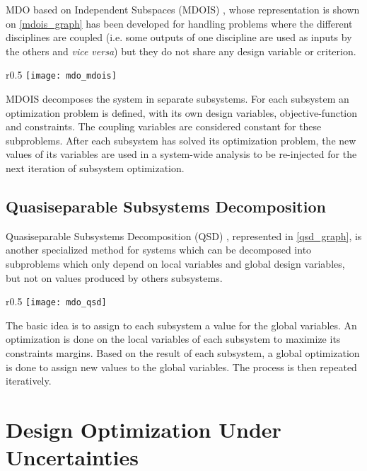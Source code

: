 MDO based on Independent Subspaces (MDOIS) \cite{NME:NME1380}, whose representation is shown on \figurename{} \ref{mdois_graph} has been developed for handling problems where the different disciplines are coupled (i.e. some outputs of one discipline are used as inputs by the others and \emph{vice versa}) but they do not share any design variable or criterion.

\begin{wrapfigure}{r}{0.5\textwidth}
\centering
\texttt{[image: mdo\_mdois]}
\caption{MDOIS method.}\label{mdois_graph}
\end{wrapfigure}

MDOIS decomposes the system in separate subsystems. For each subsystem an optimization problem is defined, with its own design variables, objective-function and constraints. The coupling variables are considered constant for these subproblems. After each subsystem has solved its optimization problem, the new values of its variables are used in a system-wide analysis to be re-injected for the next iteration of subsystem optimization.

\subsection{Quasiseparable Subsystems Decomposition}

Quasiseparable Subsystems Decomposition (QSD) \cite{1389-4420}, represented in \figurename{} \ref{qsd_graph}, is another specialized method for systems which can be decomposed into subproblems which only depend on local variables and global design variables, but not on values produced by others subsystems.

\begin{wrapfigure}{r}{0.5\textwidth}
\centering
\texttt{[image: mdo\_qsd]}
\caption{QSD method.}\label{qsd_graph}
\end{wrapfigure}

The basic idea is to assign to each subsystem a value for the global variables. An optimization is done on the local variables of each subsystem to maximize its constraints margins. Based on the result of each subsystem, a global optimization is done to assign new values to the global variables. The process is then repeated iteratively.

\section{Design Optimization Under Uncertainties}\label{SOA_uncertainties}

